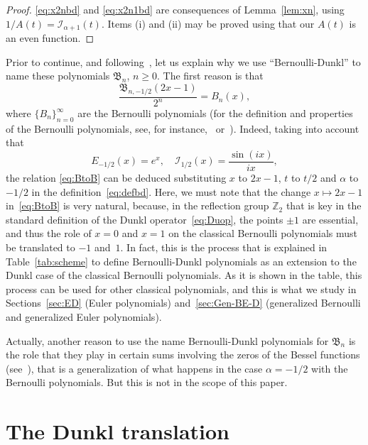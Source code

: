 \documentclass[10pt]{article}
\theoremstyle{plain}
\theoremstyle{definition}
\numberwithin{equation}{section} %
\newcommand{\I}{\mathcal{I}}
\newcommand{\B}{\mathfrak{B}}
\newcommand{\ZZ}{\mathbb{Z}}
\begin{document}
\begin{proof}
\eqref{eq:x2nbd} and \eqref{eq:x2n1bd} are consequences of Lemma~\ref{lem:xn}, using $1/A(t) = \I_{\alpha+1}(t)$. Items (i) and (ii) may be proved using that our $A(t)$ is an even function.
\end{proof}

Prior to continue, and following~\cite{CDPV}, let us explain why we use ``Bernoulli-Dunkl'' to name these polynomials $\B_n$, $n\ge 0$.
The first reason is that
\begin{equation}
\label{eq:BtoB}
  \frac{\B_{n,-1/2}(2x-1)}{2^n} = B_n(x),
\end{equation}
where $\{B_n\}_{n=0}^{\infty}$ are the Bernoulli polynomials (for the definition and properties of the Bernoulli polynomials, see, for instance,~\cite{Dil-NIST} or~\cite{DKP}). Indeed, taking into account that
\[
  E_{-1/2}(x) = e^x,\quad \I_{1/2}(x) = \frac{\sin(ix)}{ix},
\]
the relation \eqref{eq:BtoB} can be deduced substituting $x$ to $2x-1$, $t$ to $t/2$ and $\alpha$ to $-1/2$ in the definition~\eqref{eq:defbd}. 
Here, we must note that the change $x \mapsto 2x-1$ in~\eqref{eq:BtoB} is very natural, because, in the reflection group $\ZZ_2$ that is key in the standard definition of the Dunkl operator~\eqref{eq:Duop}, the points $\pm1$ are essential, and thus the role of $x=0$ and $x=1$ on the classical Bernoulli polynomials must be translated to $-1$ and~$1$.
In fact, this is the process that is explained in Table~\ref{tab:scheme} to define Bernoulli-Dunkl polynomials as an extension to the Dunkl case of the classical Bernoulli polynomials. As it is shown in the table, this process can be used for other classical polynomials, and this is what we study in Sections~\ref{sec:ED} (Euler polynomials) and~\ref{sec:Gen-BE-D} (generalized Bernoulli and generalized Euler polynomials).

Actually, another reason to use the name Bernoulli-Dunkl polynomials for $\B_n$ is the role that they play in certain sums involving the zeros of the Bessel functions (see~\cite{CDPV}), that is a generalization of what happens in the case $\alpha=-1/2$ with the Bernoulli polynomials. But this is not in the scope of this paper.


\section{The Dunkl translation}
\label{sec:Dtau}

\end{document}
